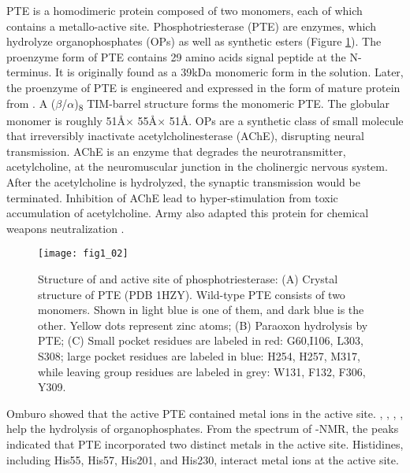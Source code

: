 \begin{refsection}
PTE is a homodimeric protein composed of two monomers, each of which contains a
metallo-active site. Phosphotriesterase (PTE) are enzymes, which hydrolyze
organophosphates (OPs) as well as synthetic esters (Figure
\ref{fig:pte-structure})\cite{Ghanem2005a}. The proenzyme form of PTE contains
29 amino acids signal peptide at the N-terminus. It is originally found as a
39kDa monomeric form in the solution\cite{Mulbry1989}. Later, the proenzyme of
PTE is engineered and expressed in the form of mature protein from . A ($\beta$/$\alpha$)\textsubscript{8} TIM-barrel structure forms the
monomeric PTE\cite{Roodveldt2005,Seibert2005}. The globular monomer is roughly
51\AA $\times$ 55\AA $\times$ 51\AA.  OPs are a synthetic class of small molecule
that irreversibly inactivate acetylcholinesterase (AChE), disrupting
neural transmission. AChE is an enzyme that degrades the neurotransmitter,
acetylcholine, at the neuromuscular junction in the cholinergic nervous system.
After the acetylcholine is hydrolyzed, the synaptic transmission would be
terminated. Inhibition of AChE lead to hyper-stimulation from toxic
accumulation of acetylcholine\cite{Soreq2001}. Army also adapted this protein
for chemical weapons neutralization \cite{Yang2014a}.
\begin{figure}[h!] \centering \texttt{[image: fig1\_02]}
    \caption[Structure of and active site of phosphotriesterase: (A) Crystal
    structure of PTE (PDB 1HZY). Wild-type PTE consists of two monomers. Shown
in light blue is one of them, and dark blue is the other. Yellow dots represent
zinc atoms; (B) Paraoxon hydrolysis by PTE; (C) Small pocket residues are
labeled in red: G60,I106, L303, S308; large pocket residues are labeled in
blue: H254, H257, M317, while leaving group residues are labeled in grey: W131,
F132, F306, Y309.] {Structure of and active site of phosphotriesterase: (A)
Crystal structure of PTE (PDB 1HZY). Wild-type PTE consists of two monomers.
Shown in light blue is one of them, and dark blue is the other. Yellow dots
represent zinc atoms; (B) Paraoxon hydrolysis by PTE;  (C) Small pocket
residues are labeled in red: G60,I106, L303, S308; large pocket residues are
labeled in blue: H254, H257, M317, while leaving group residues are labeled in
grey: W131, F132, F306, Y309.}
\label{fig:pte-structure} 
\end{figure} 

Omburo  showed that the active PTE contained metal ions in the
active site. , , , ,
 help the hydrolysis of organophosphates\cite{Omburo1992a}. From
the spectrum of -NMR, the peaks indicated that PTE incorporated
two distinct metals in the active site\cite{Omburo1993}. Histidines, including
His55, His57, His201, and His230, interact metal ions at the active
site\cite{Benning2001a}. 


\end{refsection}
